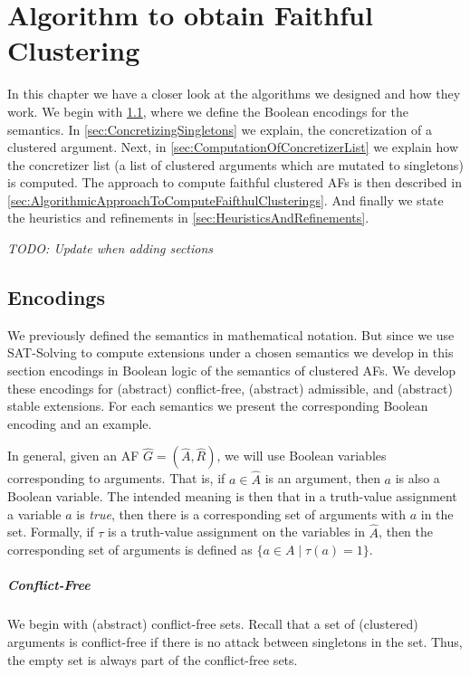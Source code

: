 \chapter{Algorithm to obtain Faithful Clustering}
In this chapter we have a closer look at the algorithms we designed and how they work.
We begin with \cref{sec:Encodings}, where we define the Boolean encodings for the semantics. In \cref{sec:ConcretizingSingletons} we explain, the concretization of a clustered argument. Next, in \cref{sec:ComputationOfConcretizerList} we explain how the concretizer list (a list of clustered arguments which are mutated to singletons) is computed. The approach to compute faithful clustered AFs is then described in \cref{sec:AlgorithmicApproachToComputeFaifthulClusterings}. And finally we state the heuristics and refinements in \cref{sec:HeuristicsAndRefinements}.

\textit{TODO: Update when adding sections}

\section{Encodings}
\label{sec:Encodings}
We previously defined the semantics in mathematical notation. But since we use SAT-Solving to compute extensions under a chosen semantics we develop in this section encodings in Boolean logic of the semantics of clustered AFs. We develop these encodings for (abstract) conflict-free, (abstract) admissible, and (abstract) stable extensions. For each semantics we present the corresponding Boolean encoding and an example.

In general, given an AF $\hat{G}=(\hat{A}, \hat{R})$, we will use Boolean variables corresponding to arguments. That is, if $a \in \hat{A}$ is an argument, then $a$ is also a Boolean variable. The intended meaning is then that in a truth-value assignment a variable $a$ is \emph{true}, then there is a corresponding set of arguments with $a$ in the set. Formally, if $\tau$ is a truth-value assignment on the variables in $\hat{A}$, then the corresponding set of arguments is defined as $\{a \in A \mid \tau(a) = 1\}$.


\paragraph{Conflict-Free} We begin with (abstract) conflict-free sets. Recall that a set of (clustered) arguments is conflict-free if there is no attack between singletons in the set. Thus, the empty set is always part of the conflict-free sets.

